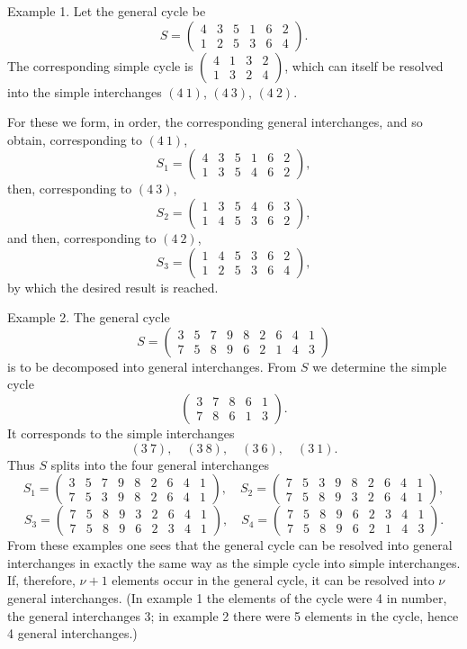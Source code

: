 \documentclass[10pt]{article}
\begin{document}
Example 1. Let the general cycle be
\[
S=\begin{pmatrix}4&3&5&1&6&2\\1&2&5&3&6&4\end{pmatrix}.
\]
The corresponding simple cycle is \(\begin{pmatrix}4&1&3&2\\1&3&2&4\end{pmatrix}\), which can itself be resolved into the simple interchanges \((4\ 1)\), \((4\ 3)\), \((4\ 2)\).

For these we form, in order, the corresponding general interchanges, and so obtain, corresponding to \((4\ 1)\),
\[
S_1=\begin{pmatrix}4&3&5&1&6&2\\1&3&5&4&6&2\end{pmatrix},
\]
then, corresponding to \((4\ 3)\),
\[
S_2=\begin{pmatrix}1&3&5&4&6&3\\1&4&5&3&6&2\end{pmatrix},
\]
and then, corresponding to \((4\ 2)\),
\[
S_3=\begin{pmatrix}1&4&5&3&6&2\\1&2&5&3&6&4\end{pmatrix},
\]
by which the desired result is reached.

Example 2. The general cycle
\[
S=\begin{pmatrix}3&5&7&9&8&2&6&4&1\\7&5&8&9&6&2&1&4&3\end{pmatrix}
\]
is to be decomposed into general interchanges. From \(S\) we determine the simple cycle
\[
\begin{pmatrix}3&7&8&6&1\\7&8&6&1&3\end{pmatrix}.
\]
It corresponds to the simple interchanges
\[
(3\ 7),\quad(3\ 8),\quad(3\ 6),\quad(3\ 1).
\]
Thus \(S\) splits into the four general interchanges
\[
S_1=\begin{pmatrix}3&5&7&9&8&2&6&4&1\\7&5&3&9&8&2&6&4&1\end{pmatrix},\quad
S_2=\begin{pmatrix}7&5&3&9&8&2&6&4&1\\7&5&8&9&3&2&6&4&1\end{pmatrix},
\]
\[
S_3=\begin{pmatrix}7&5&8&9&3&2&6&4&1\\7&5&8&9&6&2&3&4&1\end{pmatrix},\quad
S_4=\begin{pmatrix}7&5&8&9&6&2&3&4&1\\7&5&8&9&6&2&1&4&3\end{pmatrix}.
\]
From these examples one sees that the general cycle can be resolved into general interchanges in exactly the same way as the simple cycle into simple interchanges. If, therefore, \(\nu+1\) elements occur in the general cycle, it can be resolved into \(\nu\) general interchanges. (In example 1 the elements of the cycle were 4 in number, the general interchanges 3; in example 2 there were 5 elements in the cycle, hence 4 general interchanges.)
\end{document}
